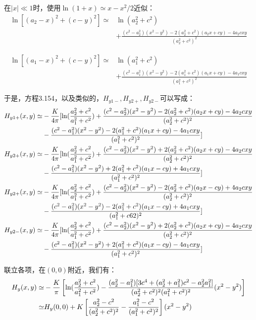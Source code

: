 在$|x|\ll 1$时，使用$\ln(1+x)\simeq x-x^2 /2$近似：
\begin{align*}
\ln[(a_{2}-x)^{2}+(c-y)^{2}]\simeq&\ln(a_{2}^{2}+c^{2})\\
&+\frac{(c^{2}-a_{2}^{2})(x^{2}-y^{2})-2(a_{2}^{2}+c^{2})(a_{2}x+cy)-4a_{2}cxy}{(a_{2}^{2}+c^{2})^{2}}
\end{align*}

\begin{align*}
\ln[(a_{1}-x)^{2}+(c-y)^{2}]\simeq&\ln(a_{1}^{2}+c^{2})\\
&+\frac{(c^{2}-a_{1}^{2})(x^{2}-y^{2})-2(a_{1}^{2}+c^{2})(a_{1}x+cy)-4a_{1}cxy}{(a_{1}^{2}+c^{2})^{2}}
\end{align*}

于是，方程3.154，以及类似的，$H_{y1−}, H_{y2+}, H_{y2−}$可以写成：
\begin{subequations}
	\begin{align}
H_{y1+}(x,y)\simeq&-\frac{K}{4\pi}[\ln(\frac{a_{2}^{2}+c^{2}}{a_{1}^{2}+c^{2}})+\frac{(c^{2}-a_{2}^{2})(x^{2}-y^{2})-2(a_{2}^{2}+c^{2})(a_{2}x+cy)-4a_{2}cxy}{(a_{2}^{2}+c^{2})^{2}}\notag\\
&-\frac{(c^{2}-a_{1}^{2})(x^{2}-y^{2})-2(a_{1}^{2}+c^{2})(a_{1}x+cy)-4a_{1}cxy}{(a_{1}^{2}+c^{2})^{2}}]\\
H_{y2+}(x,y)\simeq&-\frac{K}{4\pi}[\ln(\frac{a_{2}^{2}+c^{2}}{a_{1}^{2}+c^{2}})+\frac{(c^{2}-a_{2}^{2})(x^{2}-y^{2})+2(a_{2}^{2}+c^{2})(a_{2}x+cy)-4a_{2}cxy}{(a_{2}^{2}+c^{2})^{2}}\notag\\
&-\frac{(c^{2}-a_{1}^{2})(x^{2}-y^{2})+2(a_{1}^{2}+c^{2})(a_{1}x-cy)+4a_{1}cxy}{(a_{1}^{2}+c^{2})^{2}}]\\
H_{y2+}(x,y)\simeq&-\frac{K}{4\pi}[\ln(\frac{a_{2}^{2}+c^{2}}{a_{1}^{2}+c^{2}})+\frac{(c^{2}-a_{2}^{2})(x^{2}-y^{2})-2(a_{2}^{2}+c^{2})(a_{2}x-cy)+4a_{2}cxy}{(a_{2}^{2}+c^{2})^{2}}\notag\\
&-\frac{(c^{2}-a_{1}^{2})(x^{2}-y^{2})-2(a_{1}^{2}+c^{2})(a_{1}x-cy)+4a_{1}cxy}{(a_{1}^{2}+c6{2})^{2}}]\\
H_{y2-}(x,y)\simeq&-\frac{K}{4\pi}[\ln(\frac{a_{2}^{2}+c^{2}}{a_{1}^{2}+c^{2}})+\frac{(c^{2}-a_{2}^{2})(x^{2}-y^{2})+2(a_{2}^{2}+c^{2})(a_{2}x+cy)-4a_{2}cxy}{(a_{2}^{2}+c^{2})^{2}}\notag\\
&-\frac{(c^{2}-a_{1}^{2})(x^{2}-y^{2})+2(a_{1}^{2}+c^{2})(a_{1}x-cy)-4a_{1}cxy}{(a_{1}^{2}+c^{2})^{2}}]%
\end{align}
\end{subequations}

联立各项，在$(0,0)$附近，我们有：
\begin{align}
H_{y}(x,y)\simeq&-\frac{K}{\pi}\left[\ln(\frac{a_{2}^{2}+c^{2}}{a_{1}^{2}+c^{2}})-\frac{(a_{2}^{2}-a_{1}^{2})[3c^{4}+(a_{2}^{2}+a_{1}^{2})c^{2}-a_{2}^{2}a_{1}^{2}]}{(a_{2}^{2}+c^{2})^{2}(a_{1}^{2}+c^{2})^{2}}(x^{2}-y^{2})\right]\\ \notag
\simeq& H_{y}(0,0)+K\left[\frac{a_{2}^{2}-c^{2}}{(a_{2}^{2}+c^{2})^{2}}-\frac{a_{1}^{2}-c^{2}}{(a_{1}^{2}+c^{2})^{2}}\right](x^{2}-y^{2})
\end{align}

